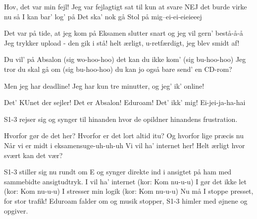 \documentclass[a4paper,11pt]{article}
\begin{document}
\begin{song}
%
  Hov, det var min fejl!
  Jeg var fejlagtigt sat til kun at svare NEJ
  det burde virke nu så I kan bar' log' på
  Det ska' nok gå
  Stol på mig--ei-ei-eieieeej

%
  Det var på tide, at jeg kom på
  Eksamen slutter snart og jeg vil gern' bestå-å-å
  Jeg trykker upload - den gik i stå!
  helt ærligt, u-retfærdigt, jeg blev smidt af!


%
  Du vil' på Absalon (sig wo-hoo-hoo)
  det kan du ikke kom' (sig bu-hoo-hoo)
  Jeg tror du skal gå om (sig bu-hoo-hoo)
  du kan jo også bare send' en CD-rom?

%
  Men jeg har deadline!
  Jeg har kun tre minutter, og jeg' ik' online!

 Det' KUnet der sejler! Det er Absalon! 
 Eduroam!
 Det' ikk' mig! Ei-jei-ja-ha-hai

\scene S1-3 rejser sig og synger til hinanden hvor de opildner hinandens frustration.

%
  Hvorfor gør de det her?
  Hvorfor er det lort altid itu? 
%
  Og hvorfor lige præcis nu
  Når vi er midt i eksamensuge-uh-uh-uh
%
  Vi vil ha' internet her!
  Helt ærligt hvor svært kan det vær?

\scene S1-3 stiller sig nu rundt om E og synger direkte ind i ansigtet på ham med sammebidte ansigtudtryk.
%
  I vil ha' internet (kor: Kom nu-u-u)
  I gør det ikke let (kor: Kom nu-u-u)
  I stresser min logik (kor: Kom nu-u-u)
  Nu må I stoppe presset, for stor trafik!
\scene Eduroam falder om og musik stopper, S1-3 himler med øjnene og opgiver.



\end{song}
\end{document}
